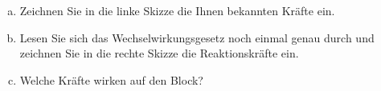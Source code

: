 
\begin{aufgabe}
	\begin{enumerate} [a)]
		\item Zeichnen Sie in die linke Skizze die Ihnen bekannten Kräfte ein.
		\item Lesen Sie sich das Wechselwirkungsgesetz noch einmal genau durch und zeichnen Sie in die rechte Skizze die Reaktionskräfte ein.
		\item Welche Kräfte wirken auf den Block?
	\end{enumerate}

	\begin{center}
	\end{center}
\end{aufgabe}
